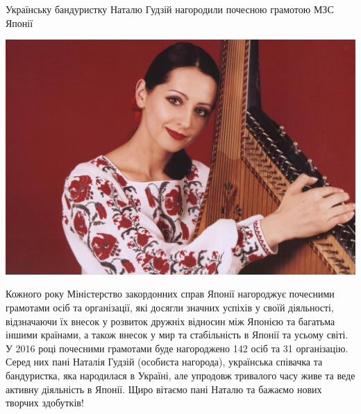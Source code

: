 \documentclass[10pt,a4paper]{article}
\newcommand{\NewsItem}[1]{%
		\usefont{T2A}{iwona}{m}{n} 
		\large #1 \vspace{4pt}
		\par \normalsize \normalfont}
\newcommand{\NewsAuthor}[1]{%
			\hfill \textsc{#1} \vspace{4pt}
			\par \normalfont}
\begin{document}
\begin{multicols}{2}
\NewsItem{Українську бандуристку Наталю Гудзій нагородили почесною грамотою МЗС Японії}
\begin{center}
\includegraphics[width=0.8\linewidth]{images/15}
\end{center}
Кожного року Міністерство закордонних справ Японії нагороджує почесними грамотами осіб та організації, які досягли значних успіхів у своїй діяльності, відзначаючи їх внесок у розвиток дружніх відносин між Японією та багатьма іншими країнами, а також внесок у мир та стабільність в Японії та усьому світі. У 2016 році почесними грамотами буде нагороджено 142 осіб та 31 організацію. Серед них пані Наталія Гудзій (особиста нагорода), українська співачка та бандуристка, яка народилася в Україні, але упродовж тривалого часу живе та веде активну діяльність в Японії. Щиро вітаємо пані Наталю та бажаємо нових творчих здобутків!

\end{multicols}

\newpage
\end{document}
